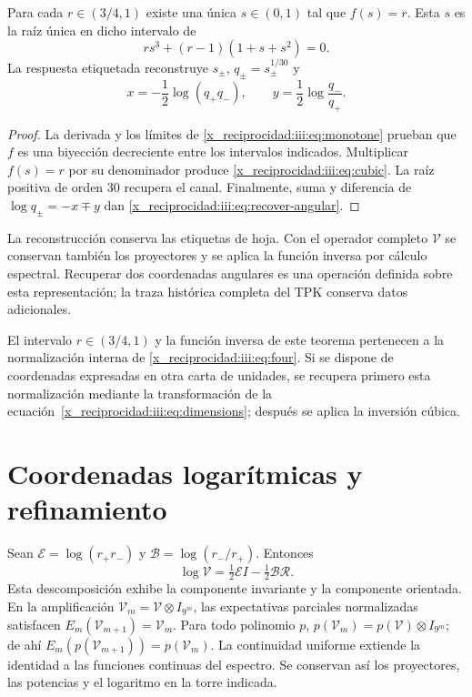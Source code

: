 \begin{theorem}
Para cada $r\in(3/4,1)$ existe una única $s\in(0,1)$ tal que $f(s)=r$.
Esta $s$ es la raíz única en dicho intervalo de
\begin{equation}
 r s^3+(r-1)(1+s+s^2)=0.
 \label{x_reciprocidad:iii:eq:cubic}
\end{equation}
La respuesta etiquetada reconstruye $s_\pm$, $q_\pm=s_\pm^{1/30}$ y
\begin{equation}
 x=-\frac12\log(q_+q_-),\qquad
 y=\frac12\log\frac{q_-}{q_+}.
 \label{x_reciprocidad:iii:eq:recover-angular}
\end{equation}
\end{theorem}
\begin{proof}
La derivada y los límites de \eqref{x_reciprocidad:iii:eq:monotone} prueban que $f$ es una
biyección decreciente entre los intervalos indicados. Multiplicar $f(s)=r$
por su denominador produce \eqref{x_reciprocidad:iii:eq:cubic}. La raíz positiva de orden
$30$ recupera el canal. Finalmente, suma y diferencia de
$\log q_\pm=-x\mp y$ dan \eqref{x_reciprocidad:iii:eq:recover-angular}.
\end{proof}

La reconstrucción conserva las etiquetas de hoja. Con el operador completo
$\mathcal V$ se conservan también los proyectores y se aplica la función
inversa por cálculo espectral. Recuperar dos coordenadas angulares es una
operación definida sobre esta representación; la traza histórica completa
del TPK conserva datos adicionales.

El intervalo $r\in(3/4,1)$ y la función inversa de este teorema pertenecen
a la normalización interna de \eqref{x_reciprocidad:iii:eq:four}. Si se dispone de
coordenadas expresadas en otra carta de unidades, se recupera primero
esta normalización mediante la transformación de la
ecuación~\eqref{x_reciprocidad:iii:eq:dimensions}; después se aplica la inversión cúbica.

\section{Coordenadas logarítmicas y refinamiento}

Sean $\mathcal E=\log(r_+r_-)$ y $\mathcal B=\log(r_-/r_+)$. Entonces
\begin{equation}
 \log\mathcal V=\tfrac12\mathcal E I-\tfrac12\mathcal B\mathcal R.
 \label{x_reciprocidad:iii:eq:logvac}
\end{equation}
Esta descomposición exhibe la componente invariante y la componente orientada.
En la amplificación $\mathcal V_m=\mathcal V\otimes I_{9^m}$, las
expectativas parciales normalizadas satisfacen
$E_m(\mathcal V_{m+1})=\mathcal V_m$. Para todo polinomio $p$,
$p(\mathcal V_m)=p(\mathcal V)\otimes I_{9^m}$; de ahí
$E_m(p(\mathcal V_{m+1}))=p(\mathcal V_m)$. La continuidad uniforme
extiende la identidad a las funciones continuas del espectro. Se conservan
así los proyectores, las potencias y el logaritmo en la torre indicada.

